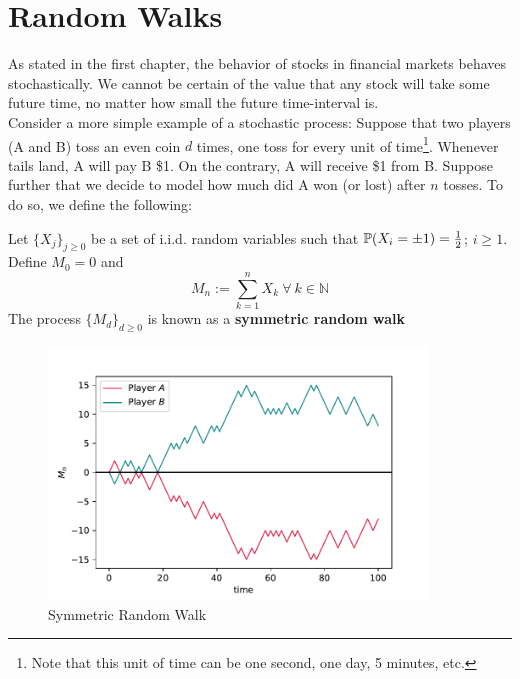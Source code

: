 \documentclass[../TGMAFFIRO]{subfiles}
\begin{document}
	


\section{Random Walks}
As stated in the first chapter, the behavior of stocks in financial markets behaves stochastically. We cannot be certain of the value that any stock will take some future time, no matter how small the future time-interval is.\\

Consider a more simple example of a stochastic process: Suppose that two players (A and B) toss an even coin $d$ times, one toss for every unit of time\footnote{Note that this unit of time can be one second, one day, 5 minutes, etc.}. Whenever tails land, A will pay B \$1. On the contrary, A will receive \$1 from B. Suppose further that we decide to model how much did A won (or lost) after $n$ tosses. To do so, we define the following:

\begin{definition}\label{srwalk}
	Let $\{X_j\}_{j\geq0}$ be a set of i.i.d. random variables such that $\mathbb{P}(X_i = \pm 1) = \frac{1}{2}$; $i \geq 1$. Define $M_0 = 0$ and
	\[M_n := \sum_{k=1}^n X_k \ \forall \ k \in \mathbb{N}\] 
	The process $\{M_d\}_{d\geq 0}$ is known as a \textbf{symmetric random walk}
\end{definition}

\begin{figure}
	\label{fig:symmetric_random_walk}
	\centering
	\includegraphics[width=0.9\textwidth]{images/symmetric_random_walk}
	\caption{Symmetric Random Walk}
\end{figure}
\end{document}
